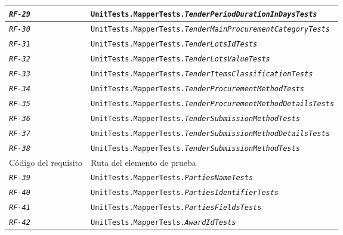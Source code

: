 \begin{longtable}{|| M{3cm} | M{12cm} ||}
                \hline
                    \texttt{\textit{RF-29}} & \texttt{UnitTests.MapperTests.\textit{TenderPeriodDurationInDaysTests}} \\
                \hline
                    \texttt{\textit{RF-30}} & \texttt{UnitTests.MapperTests.\textit{TenderMainProcurementCategoryTests}} \\
                \hline
                    \texttt{\textit{RF-31}} & \texttt{UnitTests.MapperTests.\textit{TenderLotsIdTests}} \\
                \hline
                    \texttt{\textit{RF-32}} & \texttt{UnitTests.MapperTests.\textit{TenderLotsValueTests}} \\
                \hline
                    \texttt{\textit{RF-33}} & \texttt{UnitTests.MapperTests.\textit{TenderItemsClassificationTests}} \\
                \hline
                    \texttt{\textit{RF-34}} & \texttt{UnitTests.MapperTests.\textit{TenderProcurementMethodTests}} \\
                \hline
                    \texttt{\textit{RF-35}} & \texttt{UnitTests.MapperTests.\textit{TenderProcurementMethodDetailsTests}} \\
                \hline
                    \texttt{\textit{RF-36}} & \texttt{UnitTests.MapperTests.\textit{TenderSubmissionMethodTests}} \\
                \hline
                    \texttt{\textit{RF-37}} & \texttt{UnitTests.MapperTests.\textit{TenderSubmissionMethodDetailsTests}} \\
                \hline
                    \texttt{\textit{RF-38}} & \texttt{UnitTests.MapperTests.\textit{TenderSubmissionMethodTests}} \\
                \hline
                \hline
                    Código del requisito & Ruta del elemento de prueba \\
                \hline
                    \texttt{\textit{RF-39}} & \texttt{UnitTests.MapperTests.\textit{PartiesNameTests}} \\
                \hline
                    \texttt{\textit{RF-40}} & \texttt{UnitTests.MapperTests.\textit{PartiesIdentifierTests}} \\
                \hline
                    \texttt{\textit{RF-41}} & \texttt{UnitTests.MapperTests.\textit{PartiesFieldsTests}} \\
                \hline
                    \texttt{\textit{RF-42}} & \texttt{UnitTests.MapperTests.\textit{AwardIdTests}} \\

\end{longtable}
